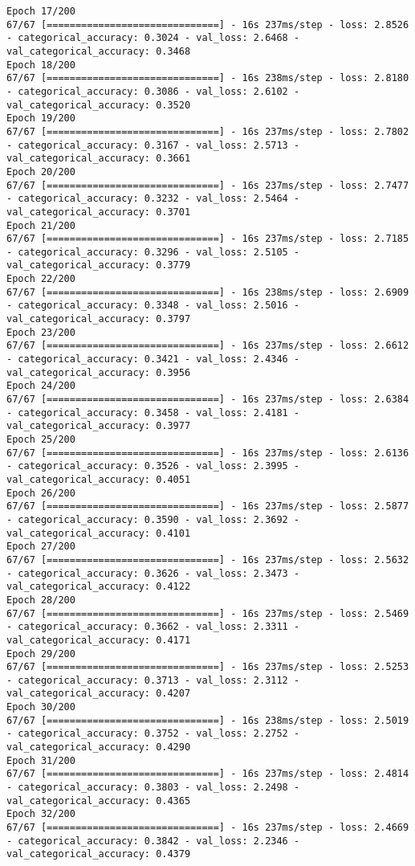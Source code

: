 \begin{lstlisting}
Epoch 17/200
67/67 [==============================] - 16s 237ms/step - loss: 2.8526 - categorical_accuracy: 0.3024 - val_loss: 2.6468 - val_categorical_accuracy: 0.3468
Epoch 18/200
67/67 [==============================] - 16s 238ms/step - loss: 2.8180 - categorical_accuracy: 0.3086 - val_loss: 2.6102 - val_categorical_accuracy: 0.3520
Epoch 19/200
67/67 [==============================] - 16s 237ms/step - loss: 2.7802 - categorical_accuracy: 0.3167 - val_loss: 2.5713 - val_categorical_accuracy: 0.3661
Epoch 20/200
67/67 [==============================] - 16s 237ms/step - loss: 2.7477 - categorical_accuracy: 0.3232 - val_loss: 2.5464 - val_categorical_accuracy: 0.3701
Epoch 21/200
67/67 [==============================] - 16s 237ms/step - loss: 2.7185 - categorical_accuracy: 0.3296 - val_loss: 2.5105 - val_categorical_accuracy: 0.3779
Epoch 22/200
67/67 [==============================] - 16s 238ms/step - loss: 2.6909 - categorical_accuracy: 0.3348 - val_loss: 2.5016 - val_categorical_accuracy: 0.3797
Epoch 23/200
67/67 [==============================] - 16s 237ms/step - loss: 2.6612 - categorical_accuracy: 0.3421 - val_loss: 2.4346 - val_categorical_accuracy: 0.3956
Epoch 24/200
67/67 [==============================] - 16s 237ms/step - loss: 2.6384 - categorical_accuracy: 0.3458 - val_loss: 2.4181 - val_categorical_accuracy: 0.3977
Epoch 25/200
67/67 [==============================] - 16s 237ms/step - loss: 2.6136 - categorical_accuracy: 0.3526 - val_loss: 2.3995 - val_categorical_accuracy: 0.4051
Epoch 26/200
67/67 [==============================] - 16s 237ms/step - loss: 2.5877 - categorical_accuracy: 0.3590 - val_loss: 2.3692 - val_categorical_accuracy: 0.4101
Epoch 27/200
67/67 [==============================] - 16s 237ms/step - loss: 2.5632 - categorical_accuracy: 0.3626 - val_loss: 2.3473 - val_categorical_accuracy: 0.4122
Epoch 28/200
67/67 [==============================] - 16s 237ms/step - loss: 2.5469 - categorical_accuracy: 0.3662 - val_loss: 2.3311 - val_categorical_accuracy: 0.4171
Epoch 29/200
67/67 [==============================] - 16s 237ms/step - loss: 2.5253 - categorical_accuracy: 0.3713 - val_loss: 2.3112 - val_categorical_accuracy: 0.4207
Epoch 30/200
67/67 [==============================] - 16s 238ms/step - loss: 2.5019 - categorical_accuracy: 0.3752 - val_loss: 2.2752 - val_categorical_accuracy: 0.4290
Epoch 31/200
67/67 [==============================] - 16s 237ms/step - loss: 2.4814 - categorical_accuracy: 0.3803 - val_loss: 2.2498 - val_categorical_accuracy: 0.4365
Epoch 32/200
67/67 [==============================] - 16s 237ms/step - loss: 2.4669 - categorical_accuracy: 0.3842 - val_loss: 2.2346 - val_categorical_accuracy: 0.4379

\end{lstlisting}
